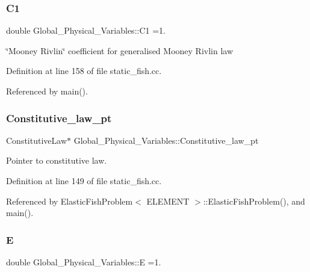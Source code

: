\subsubsection{\texorpdfstring{C1}{C1}}
{\footnotesize\ttfamily double Global\+\_\+\+Physical\+\_\+\+Variables\+::\+C1 =1.}



\char`\"{}\+Mooney Rivlin\char`\"{} coefficient for generalised Mooney Rivlin law 



Definition at line 158 of file static\+\_\+fish.\+cc.



Referenced by main().

\mbox{\label{namespaceGlobal__Physical__Variables_a2a37fb040c832ee7a086bb13bb02a100}} 
\subsubsection{\texorpdfstring{Constitutive\+\_\+law\+\_\+pt}{Constitutive\_law\_pt}}
{\footnotesize\ttfamily Constitutive\+Law$\ast$ Global\+\_\+\+Physical\+\_\+\+Variables\+::\+Constitutive\+\_\+law\+\_\+pt}



Pointer to constitutive law. 



Definition at line 149 of file static\+\_\+fish.\+cc.



Referenced by Elastic\+Fish\+Problem$<$ E\+L\+E\+M\+E\+N\+T $>$\+::\+Elastic\+Fish\+Problem(), and main().

\mbox{\label{namespaceGlobal__Physical__Variables_a09a019474b7405b35da2437f7779bc7e}} 
\subsubsection{\texorpdfstring{E}{E}}
{\footnotesize\ttfamily double Global\+\_\+\+Physical\+\_\+\+Variables\+::E =1.}



